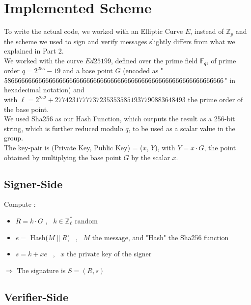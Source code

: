 \documentclass{article}
\begin{document}
\section{Implemented Scheme}

To write the actual code, we worked with an Elliptic Curve $E$, instead of $\mathbb{Z}_p$ and the scheme we used to sign and verify messages slightly differs from what we explained in Part 2. \\

\noindent
We worked with the curve $Ed25199$, defined over the prime field $\mathbb{F}_q$, of prime order $q = 2^{255} - 19$ and a base point $G$ (encoded as "$586666666666666666666666666 \\ 6666666666666666666666666666666666666$" in hexadecimal notation) and  \\ with $\ell = 2^{252} + 27742317777372353535851937790883648493$ the prime order of the base point. \\

\noindent
We used Sha256 as our Hash Function, which outputs the result as a 256-bit string, which is further reduced modulo $q$, to be used as a scalar value in the group. \\

\noindent
The key-pair is (Private Key, Public Key) = ($x$, $Y$), with $Y = x \cdot G$, the point obtained by multiplying the base point $G$ by the scalar $x$.



\subsection{Signer-Side}

Compute : \

\begin{itemize}

    \item $R = k \cdot G$ \ , \ $k \in \mathbb{Z}_\ell^*$ random
    
    \item $e =$ Hash($M \| R$) \ , \ $M$ the message, and "Hash" the Sha256 function

    \item $s = k + xe$ \ , \ $x$ the private key of the signer

\end{itemize}

$\Rightarrow$ The signature is $S = (R, s)$



\subsection{Verifier-Side}
\end{document}
